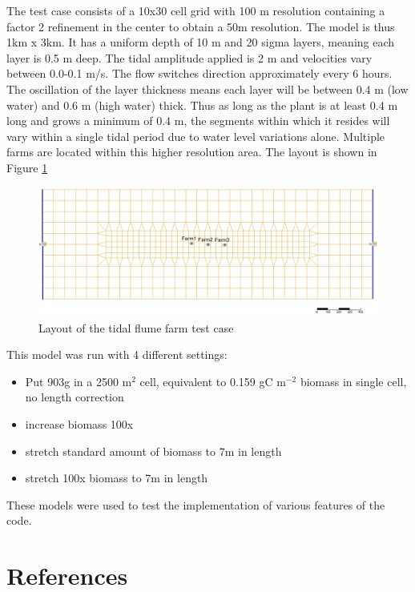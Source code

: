 \documentclass{deltares_manual}
\begin{document}
The test case consists of a 10x30 cell grid with 100 m resolution containing a factor 2 refinement  in the center to obtain a 50m resolution. The model is thus 1km x 3km. It has a uniform depth of 10 m and 20 sigma layers, meaning each layer is 0.5 m deep. The tidal amplitude applied is 2 m and velocities vary between 0.0-0.1 m/s. The flow switches direction approximately every 6 hours. The oscillation of the layer thickness means each layer will be between 0.4 m (low water) and 0.6 m (high water) thick. Thus as long as the plant is at least 0.4 m long and grows a minimum of 0.4 m, the segments within which it resides will vary within a single tidal period due to water level variations alone. Multiple farms are located within this higher resolution area. The layout is shown in Figure \ref{fig:tidalflumefarm}

\begin{figure}[H]
	\centering
	\includegraphics[width=1\linewidth]{figures/tidal_flume_farm}
	\caption{Layout of the tidal flume farm test case}
	\label{fig:tidalflumefarm}
\end{figure}

This model was run with 4 different settings:
\begin{itemize}
	\item Put 903g in a 2500 m$^{2}$ cell, equivalent to 0.159 gC m$^{-2}$ biomass in single cell, no length correction
	\item increase biomass 100x
	\item stretch standard amount of biomass to 7m in length
	\item stretch 100x biomass to 7m in length
\end{itemize}

These models were used to test the implementation of various features of the code.

\chapter{References}

\end{document}
